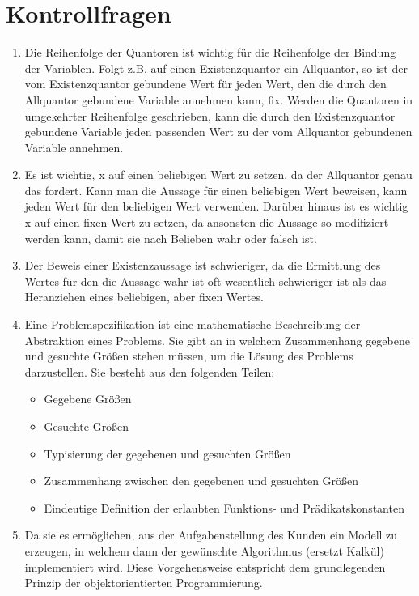 \documentclass[a4paper]{article}
\begin{document}
	\section{Kontrollfragen}
	\begin{enumerate}
		\item
		Die Reihenfolge der Quantoren ist wichtig für die Reihenfolge der Bindung der Variablen.
		Folgt z.B. auf einen Existenzquantor ein Allquantor, so ist der vom Existenzquantor gebundene Wert für jeden Wert, den die durch den Allquantor gebundene Variable annehmen kann, fix.
		Werden die Quantoren in umgekehrter Reihenfolge geschrieben, kann die durch den Existenzquantor gebundene Variable jeden passenden Wert zu der vom Allquantor gebundenen Variable annehmen.
		
		\item
		Es ist wichtig, x auf einen beliebigen Wert zu setzen, da der Allquantor genau das fordert. Kann man die Aussage für einen beliebigen Wert beweisen, kann jeden Wert für den beliebigen Wert verwenden.
		Darüber hinaus ist es wichtig x auf einen fixen Wert zu setzen, da ansonsten die Aussage so modifiziert werden kann, damit sie nach Belieben wahr oder falsch ist.
		
		\item
		Der Beweis einer Existenzaussage ist schwieriger, da die Ermittlung des Wertes für den die Aussage wahr ist oft wesentlich schwieriger ist als das Heranziehen eines beliebigen, aber fixen Wertes.
		
		\item
		Eine Problemspezifikation ist eine mathematische Beschreibung der Abstraktion eines Problems.
		Sie gibt an in welchem Zusammenhang gegebene und gesuchte Größen stehen müssen, um die Lösung des Problems darzustellen.
		Sie besteht aus den folgenden Teilen:
		\begin{itemize}
			\item Gegebene Größen
			\item Gesuchte Größen
			\item Typisierung der gegebenen und gesuchten Größen
			\item Zusammenhang zwischen den gegebenen und gesuchten Größen
			\item Eindeutige Definition der erlaubten Funktions- und Prädikatskonstanten
		\end{itemize}
		
		\item
		Da sie es ermöglichen, aus der Aufgabenstellung des Kunden ein Modell zu erzeugen, in welchem dann der gewünschte Algorithmus (ersetzt Kalkül) implementiert wird. Diese Vorgehensweise entspricht dem grundlegenden Prinzip der objektorientierten Programmierung.
		

\end{enumerate}
\end{document}
